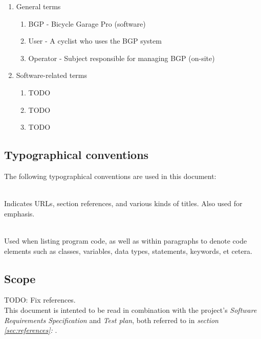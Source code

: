 \documentclass[12pt,titlepage]{article}
\begin{document}
\begin{enumerate}
	\item General terms
	\begin{enumerate}
		\item BGP - Bicycle Garage Pro (software)
		\item User - A cyclist who uses the BGP system
		\item Operator - Subject responsible for managing BGP (on-site)
	\end{enumerate}
	\item Software-related terms
	\begin{enumerate}
		\item TODO
		\item TODO
		\item TODO
	\end{enumerate}
\end{enumerate}

\subsection{Typographical conventions}
\label{subsec:introduction-typographical-conventions}

The following typographical conventions are used in this document:

\begin{description}[font=\normalfont]
	\item[\textit{Italic}] \hfill \\
		Indicates URLs, section references, and various kinds of titles.
		Also used for emphasis.
	\item[\texttt{Constant width}] \hfill \\
		Used when listing program code, as well as within paragraphs to
		denote code elements such as classes, variables, data types,
		statements, keywords, et cetera.
\end{description}

\subsection{Scope}
\label{subsec:introduction-scope}

TODO: Fix references. \\

This document is intented to be read in combination with the project's
\textit{Software Requirements Specification} and \textit{Test plan}, both
referred to in \textit{section \ref{sec:references}: }.
\end{document}
